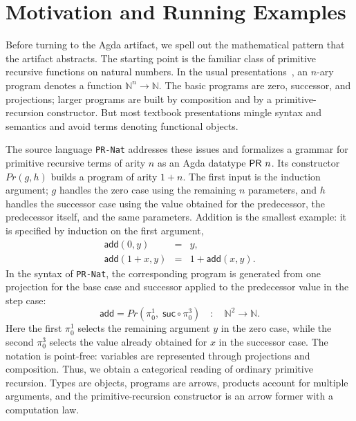 \documentclass[sigplan,10pt,anonymous,review,screen]{acmart}
\newcommand{\AgdaFile}[1]{\texttt{#1}}
\begin{document}
\section{Motivation and Running Examples}
\label{sec:motivation}

Before turning to the Agda artifact, we spell out the mathematical
pattern that the artifact abstracts.  The starting point is the familiar
class of primitive recursive functions on natural numbers.  In the usual
presentations~\cite{boolos07:_comput_logic,wiki:Primitive_recursive_function},
an \(n\)-ary program denotes a function
\(\mathbb{N}^n \to \mathbb{N}\).  The basic programs are zero,
successor, and projections; larger programs are built by composition and
by a primitive-recursion constructor. But most textbook presentations
mingle syntax and semantics and avoid terms denoting functional objects.

The source language \AgdaFile{PR-Nat} addresses these issues and
formalizes a grammar for primitive recursive terms of arity $n$ as an
Agda datatype \(\AgdaDatatype{PR}\ n\).  Its constructor \(Pr(g,h)\)
builds a program of arity \(1+n\). 
The first input is the induction argument; \(g\) handles the zero case
using the remaining \(n\) parameters, and \(h\) handles the successor
case using the value obtained for the predecessor, the predecessor
itself, and the same parameters.  Addition is the smallest example: it
is specified by induction on the first argument,
\[
  \begin{array}{rcl}
  \mathsf{add}(0,y) &=& y,\\
  \mathsf{add}(1+x,y) &=& 1 + \mathsf{add}(x,y).
  \end{array}
\]
In the syntax of \AgdaFile{PR-Nat}, the corresponding program is
generated from one projection for the base case and successor applied to
the predecessor value in the step case:
\[
  \mathsf{add}
  =
  Pr(\pi^1_0,\; \mathsf{suc} \circ \pi^3_0)
  \quad:\quad \mathbb{N}^2 \to \mathbb{N}.
\]
Here the first \(\pi^1_0\) selects the remaining argument \(y\) in the
zero case, while the second \(\pi^3_0\) selects the value already obtained
for \(x\) in the successor case.  The notation is point-free:
variables are represented through projections and
composition.  Thus, we obtain a categorical reading of ordinary
primitive recursion.  Types are objects, programs are arrows, products
account for multiple arguments, and the primitive-recursion constructor
is an arrow former with a computation law.
\end{document}
